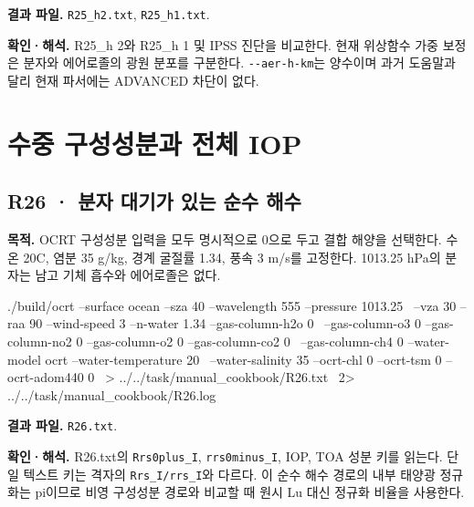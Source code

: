 \textbf{결과 파일. }\texttt{R25\_\allowbreak{}h2.txt}, \texttt{R25\_\allowbreak{}h1.txt}.

\textbf{확인·해석. }R25\_h 2와 R25\_h 1 및 IPSS 진단을 비교한다. 현재 위상함수 가중 보정은 분자와 에어로졸의 광원 분포를 구분한다. \texttt{-\allowbreak{}-\allowbreak{}aer-\allowbreak{}h-\allowbreak{}km}는 양수이며 과거 도움말과 달리 현재 파서에는 ADVANCED 차단이 없다.

\section{수중 구성성분과 전체 IOP}
\label{sec:auto:09_cookbook:6}


\subsection{R26 · 분자 대기가 있는 순수 해수}
\label{sec:auto:09_cookbook:6.1}

\label{recipe:R26}

\textbf{목적. }OCRT 구성성분 입력을 모두 명시적으로 0으로 두고 결합 해양을 선택한다. 수온 20\textdegree{}C, 염분 35 g/kg, 경계 굴절률 1.34, 풍속 3 m/s를 고정한다. 1013.25 hPa의 분자는 남고 기체 흡수와 에어로졸은 없다.

\noindent\begin{minipage}{\linewidth}
\begin{ManualCode}

./build/ocrt --surface ocean --sza 40 --wavelength 555 --pressure 1013.25 \
  --vza 30 --raa 90 --wind-speed 3 --n-water 1.34 --gas-column-h2o 0 \
  --gas-column-o3 0 --gas-column-no2 0 --gas-column-o2 0 --gas-column-co2 0 \
  --gas-column-ch4 0 --water-model ocrt --water-temperature 20 \
  --water-salinity 35 --ocrt-chl 0 --ocrt-tsm 0 --ocrt-adom440 0 \
  > ../../task/manual_cookbook/R26.txt \
  2> ../../task/manual_cookbook/R26.log

\end{ManualCode}
\end{minipage}\par

\textbf{결과 파일. }\texttt{R26.txt}.

\textbf{확인·해석. }R26.txt의 \texttt{Rrs0plus\_\allowbreak{}I}, \texttt{rrs0minus\_\allowbreak{}I}, IOP, TOA 성분 키를 읽는다. 단일 텍스트 키는 격자의 \texttt{Rrs\_\allowbreak{}I/\allowbreak{}rrs\_\allowbreak{}I}와 다르다. 이 순수 해수 경로의 내부 태양광 정규화는 pi이므로 비영 구성성분 경로와 비교할 때 원시 Lu 대신 정규화 비율을 사용한다.

